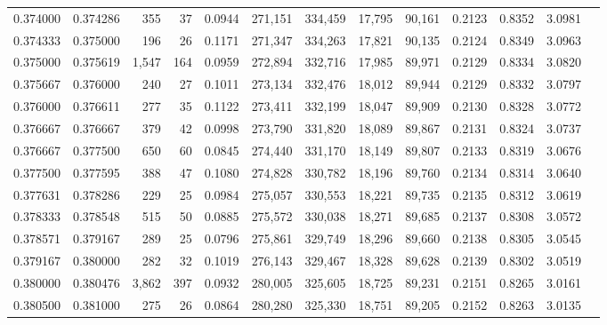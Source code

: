 \begin{tabular}{rrrrrrrrrrrrr}
0.374000 & 0.374286 &   355 &  37 &                                     0.0944 & 271,151 & 334,459 &  17,795 &  90,161 & 0.2123 & 0.8352 & 3.0981 \\
0.374333 & 0.375000 &   196 &  26 &                                     0.1171 & 271,347 & 334,263 &  17,821 &  90,135 & 0.2124 & 0.8349 & 3.0963 \\
0.375000 & 0.375619 & 1,547 & 164 &                                     0.0959 & 272,894 & 332,716 &  17,985 &  89,971 & 0.2129 & 0.8334 & 3.0820 \\
0.375667 & 0.376000 &   240 &  27 &                                     0.1011 & 273,134 & 332,476 &  18,012 &  89,944 & 0.2129 & 0.8332 & 3.0797 \\
0.376000 & 0.376611 &   277 &  35 &                                     0.1122 & 273,411 & 332,199 &  18,047 &  89,909 & 0.2130 & 0.8328 & 3.0772 \\
0.376667 & 0.376667 &   379 &  42 &                                     0.0998 & 273,790 & 331,820 &  18,089 &  89,867 & 0.2131 & 0.8324 & 3.0737 \\
0.376667 & 0.377500 &   650 &  60 &                                     0.0845 & 274,440 & 331,170 &  18,149 &  89,807 & 0.2133 & 0.8319 & 3.0676 \\
0.377500 & 0.377595 &   388 &  47 &                                     0.1080 & 274,828 & 330,782 &  18,196 &  89,760 & 0.2134 & 0.8314 & 3.0640 \\
0.377631 & 0.378286 &   229 &  25 &                                     0.0984 & 275,057 & 330,553 &  18,221 &  89,735 & 0.2135 & 0.8312 & 3.0619 \\
0.378333 & 0.378548 &   515 &  50 &                                     0.0885 & 275,572 & 330,038 &  18,271 &  89,685 & 0.2137 & 0.8308 & 3.0572 \\
0.378571 & 0.379167 &   289 &  25 &                                     0.0796 & 275,861 & 329,749 &  18,296 &  89,660 & 0.2138 & 0.8305 & 3.0545 \\
0.379167 & 0.380000 &   282 &  32 &                                     0.1019 & 276,143 & 329,467 &  18,328 &  89,628 & 0.2139 & 0.8302 & 3.0519 \\
0.380000 & 0.380476 & 3,862 & 397 &                                     0.0932 & 280,005 & 325,605 &  18,725 &  89,231 & 0.2151 & 0.8265 & 3.0161 \\
0.380500 & 0.381000 &   275 &  26 &                                     0.0864 & 280,280 & 325,330 &  18,751 &  89,205 & 0.2152 & 0.8263 & 3.0135 \\

\end{tabular}
